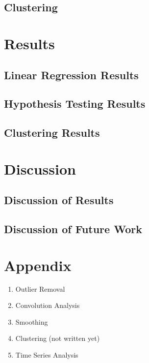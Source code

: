 \documentclass[11pt]{article}
\begin{document}
		

	\subsection{Clustering}
	
		
		
\section{Results}
		
	\subsection{Linear Regression Results}
	
		
				
	\subsection{Hypothesis Testing Results}
	
		
		
	\subsection{Clustering Results}
	
		

\section{Discussion}
	
	\subsection{Discussion of Results}
		
		
		
	\subsection{Discussion of Future Work}
	
		
		



\section{Appendix}

\begin{enumerate}
	\item Outlier Removal

	\item Convolution Analysis

	\item Smoothing

	\item Clustering (not written yet)

	\item Time Series Analysis

\end{enumerate}
\end{document}

